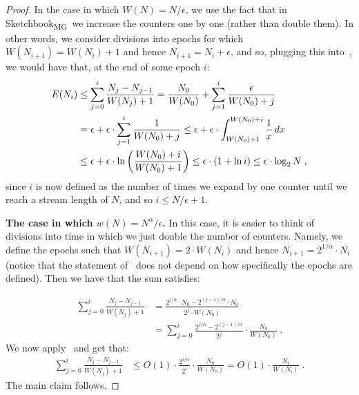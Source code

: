 \documentclass[sigconf]{acmart}
\newcommand{\sketch}{Sketchbook}
\newcommand{\sketchmg}{\sketch\textsubscript{MG}\xspace}
\begin{document}
\begin{proof}
In the case in which $W(N)=N/\epsilon$, we use the fact that in \sketchmg\, we increase the counters one by one (rather than double them). In other words, we consider divisions into epochs for which $W(N_{i+1})=W(N_i)+1$ and hence $N_{i+1}=N_i+\epsilon$, and so, plugging this into~, we would have that, at the end of some epoch $i$:
	\begin{align*}
		E(N_i)&\leq \sum_{j=0}^i  \frac{N_j - N_{j-1}}{W(N_j)+1} = \frac{N_0}{W(N_0)} + \sum_{j=1}^i  \frac{\epsilon}{W(N_0)+j} \\
		&= \epsilon + \epsilon \cdot \sum_{j=1}^i  \frac{1}{W(N_0)+j} \leq \epsilon + \epsilon \cdot \int_{W(N_0)+1}^{W(N_0)+i} \frac{1}{x} \,dx\\
		& \leq \epsilon + \epsilon \cdot \ln\left(\frac{W(N_0)+i}{W(N_0)+1}\right) \leq \epsilon \cdot (1+\ln i) \leq \epsilon \cdot \log_2 N\;,
	\end{align*}
since $i$ is now defined as the number of times we expand by one counter until we reach a stream length of $N$, and so $i \leq N/\epsilon+1$. 


\medskip\noindent
\textbf{The case in which $w(N)=N^{\alpha}/\epsilon$.} In this case, it is easier to think of divisions into time in which we just double the number of counters. Namely, we define the epochs such that $W(N_{i+1}) = 2\cdot W(N_i)$ and hence $N_{i+1} = 2^{1/\alpha} \cdot N_i$ (notice that the statement of~ does not depend on how specifically the epochs are defined). Then we have that the sum satisfies:



%

\begin{align*}
\sum_{j=0}^i  \frac{N_j - N_{j-1}}{W(N_j)+1} & = \frac{2^{j/\alpha} \cdot N_0 - 2^{(j-1)/\alpha} \cdot N_0} {2^j \cdot W(N_0)} \\
&=  \sum_{j=0}^i  \frac{2^{j/\alpha}- 2^{(j-1)/\alpha}} {2^j} \cdot \frac{N_0}{W(N_0)}\;.
\end{align*}
We now apply~ and get that:
\begin{align*}
\sum_{j=0}^i  \frac{N_j - N_{j-1}}{W(N_j)+1} & \leq  O(1) \cdot \frac{2^{i/\alpha}}{2^i} \cdot \frac{N_0}{W(N_0)} = O(1) \cdot \frac{N_i}{W(N_i)} \;.
\end{align*}
The main claim follows.
\end{proof}
\end{document}
